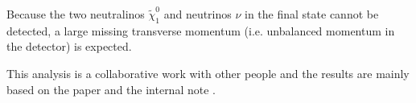 Because the two neutralinos $\tilde{\chi}_1^0$ and neutrinos $\nu$ in the final state cannot be detected, a large missing transverse momentum (i.e. unbalanced momentum in the detector) is expected.

This analysis is a collaborative work with other people and the results are mainly based on the paper \cite{Wh} and the internal note \cite{WhSS}.
